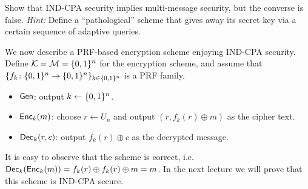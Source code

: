 \documentclass[11pt]{article}
\begin{document}
\begin{exercise}
  Show that IND-CPA security implies
  multi-message security, but the converse is false.  \textit{Hint:}
  Define a ``pathological'' scheme that gives away its secret key via a
  certain sequence of adaptive queries.
\end{exercise}

We now describe a PRF-based encryption scheme enjoying IND-CPA
security.  Define $\mathcal{K} = \mathcal{M} = \{0,1\}^{n}$ for the
encryption scheme, and assume that $\{f_{k} \colon \{0,1\}^{n} \to
  \{0,1\}^{n}\}_{k \in \{0,1\}^{n}}$ is a PRF family.
\begin{itemize}
\item $\mathsf{Gen}$: output $k \gets \{0,1\}^n$.
\item $\mathsf{Enc}_k(m)$: choose $r \gets U_n$ and output $(r, f_k(r)
  \oplus m)$ as the cipher text.
\item $\mathsf{Dec}_k(r,c)$: output $f_k(r) \oplus c$ as the decrypted
  message.
\end{itemize}

It is easy to observe that the scheme is correct,
i.e. $\mathsf{Dec}_k(\mathsf{Enc}_k (m)) = f_k(r) \oplus f_k(r) \oplus m =
m$. In the next lecture we will prove that this scheme is IND-CPA
secure.
\end{document}
